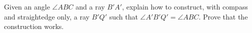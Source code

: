 Given an angle $\angle ABC$ and a ray $B'A'$, explain how to construct, with compass and straightedge only, a ray $B'Q'$ such that $\angle A'B'Q'=\angle ABC$. Prove that the construction works.

